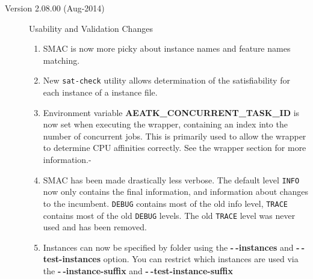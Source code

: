 \documentclass[11pt,letterpaper,oneside]{article}
\begin{document}
\begin{description}
          \item[Version 2.08.00 (Aug-2014)] Usability and Validation Changes
          	\begin{enumerate}
          		\item SMAC is now more picky about instance names and feature names matching.
          		\item New \texttt{sat-check} utility allows determination of the satisfiability for each instance of a instance file.
          		\item Environment variable \textbf{AEATK\_CONCURRENT\_TASK\_ID} is now set when executing the wrapper, containing an index into the number of concurrent jobs. This is primarily used to allow the wrapper to determine CPU affinities correctly. See the wrapper section for more information.-
          		\item SMAC has been made drastically less verbose. The default level \texttt{INFO} now only contains the final information, and information about changes to the incumbent. \texttt{DEBUG} contains most of the old info level, \texttt{TRACE} contains most of the old \texttt{DEBUG} levels. The old \texttt{TRACE} level was never used and has been removed.
          		\item Instances can now be specified by folder using the \textbf{-$~\!$-instances} and \textbf{-$~\!$-test-instances} option. You can restrict which instances are used via the \textbf{-$~\!$-instance-suffix}  and \textbf{-$~\!$-test-instance-suffix} 
          		

\end{enumerate}
\end{description}
\end{document}
